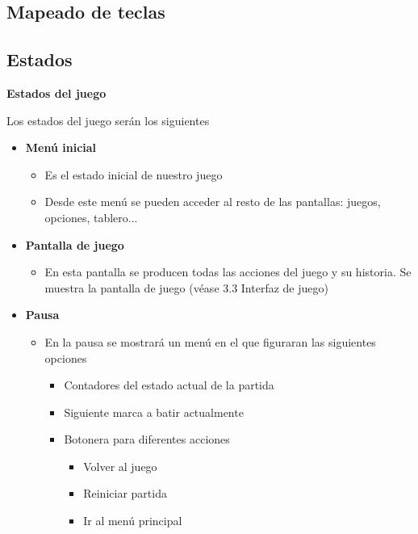 \documentclass[palatino]{apuntes}
\begin{document}
\subsection{Mapeado de teclas}




\subsection{Estados}

\textbf{Estados del juego}

Los estados del juego serán los siguientes
\begin{itemize}
    \item \textbf{Menú inicial}
        \begin{itemize}
            \item Es el estado inicial de nuestro juego
            \item Desde este menú se pueden acceder al resto de las pantallas: juegos, opciones, tablero...
        \end{itemize}
    \item \textbf{Pantalla de juego}
        \begin{itemize}
            \item En esta pantalla se producen todas las acciones del juego y su historia. Se muestra la pantalla de juego (véase 3.3 Interfaz de juego)
        \end{itemize}
    \item \textbf{Pausa}
        \begin{itemize}
            \item En la pausa se mostrará un menú en el que figuraran las siguientes opciones
                \begin{itemize}
                    \item Contadores del estado actual de la partida
                    \item Siguiente marca a batir actualmente
                    \item Botonera para diferentes acciones 
                         \begin{itemize}
                            \item Volver al juego
                            \item Reiniciar partida
                            \item Ir al menú principal
                        \end{itemize}
                \end{itemize}

\end{itemize}
\end{itemize}
\end{document}
